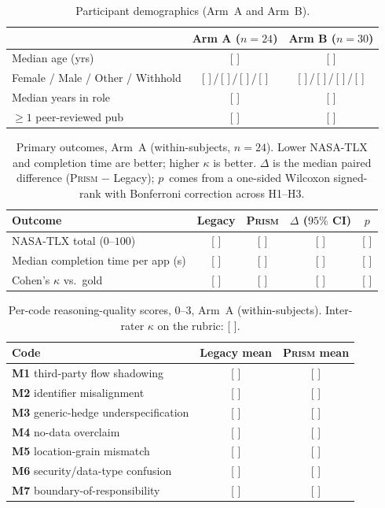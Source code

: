 \documentclass[11pt,a4paper]{article}
\newcommand{\prism}{\textsc{Prism}}
\newcommand{\code}[1]{\textsf{\textbf{#1}}}
\begin{document}
\begin{table}[t]
\centering\small
\caption{Participant demographics (Arm~A and Arm~B).}\label{tab:participants}
\begin{tabular}{lcc}
\toprule
& \textbf{Arm A} ($n=24$) & \textbf{Arm B} ($n=30$) \\
\midrule
Median age (yrs)                 & [\,\,] & [\,\,] \\
Female / Male / Other / Withhold & [\,\,]\,/\,[\,\,]\,/\,[\,\,]\,/\,[\,\,] & [\,\,]\,/\,[\,\,]\,/\,[\,\,]\,/\,[\,\,] \\
Median years in role             & [\,\,] & [\,\,] \\
$\geq 1$ peer-reviewed pub       & [\,\,] & [\,\,] \\
\bottomrule
\end{tabular}
\end{table}

\begin{table}[t]
\centering\small
\caption{Primary outcomes, Arm~A (within-subjects, $n=24$). Lower
NASA-TLX and completion time are better; higher $\kappa$ is better.
$\Delta$ is the median paired difference (\prism{} $-$ Legacy);
$p$~comes from a one-sided Wilcoxon signed-rank with Bonferroni
correction across H1--H3.}\label{tab:armA-primary}
\begin{tabular}{lcccc}
\toprule
\textbf{Outcome} & \textbf{Legacy} & \textbf{\prism{}} & \textbf{$\Delta$ ($95\%$ CI)} & \textbf{$p$} \\
\midrule
NASA-TLX total ($0$--$100$)     & [\,\,] & [\,\,] & [\,\,] & [\,\,] \\
Median completion time per app (s) & [\,\,] & [\,\,] & [\,\,] & [\,\,] \\
Cohen's $\kappa$ vs.\ gold      & [\,\,] & [\,\,] & [\,\,] & [\,\,] \\
\bottomrule
\end{tabular}
\end{table}

\begin{table}[t]
\centering\small
\caption{Per-code reasoning-quality scores, $0$--$3$, Arm~A
(within-subjects). Inter-rater $\kappa$ on the rubric: [\,\,].}
\label{tab:reasoning}
\begin{tabular}{lcc}
\toprule
\textbf{Code} & \textbf{Legacy mean} & \textbf{\prism{} mean} \\
\midrule
\code{M1} third-party flow shadowing       & [\,\,] & [\,\,] \\
\code{M2} identifier misalignment          & [\,\,] & [\,\,] \\
\code{M3} generic-hedge underspecification & [\,\,] & [\,\,] \\
\code{M4} no-data overclaim                & [\,\,] & [\,\,] \\
\code{M5} location-grain mismatch          & [\,\,] & [\,\,] \\
\code{M6} security/data-type confusion     & [\,\,] & [\,\,] \\
\code{M7} boundary-of-responsibility       & [\,\,] & [\,\,] \\
\bottomrule
\end{tabular}
\end{table}
\end{document}
